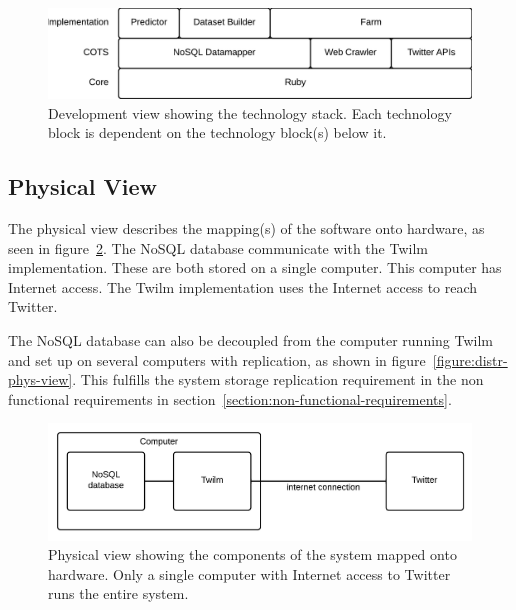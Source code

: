 \begin{figure}[H]
    \centerline{\includegraphics[width=4.5in]{image/architecture-development-view.png}}
    \caption[Development view]{Development view showing the technology stack. Each technology block is dependent on the technology block(s) below it.}
    \label{figure:development-view}
\end{figure}

\subsection{Physical View}
The physical view describes the mapping(s) of the software onto hardware, as seen in figure~\ref{figure:physical-view}. The NoSQL database communicate with the Twilm implementation. These are both stored on a single computer. This computer has Internet access. The Twilm implementation uses the Internet access to reach Twitter.

The NoSQL database can also be decoupled from the computer running Twilm and set up on several computers with replication, as shown in figure~\ref{figure:distr-phys-view}. This fulfills the system storage replication requirement in the non functional requirements in section~\ref{section:non-functional-requirements}.

\begin{figure}[H]
\centerline{\includegraphics[width=4.5in]{image/architecture-physical-view.png}}
\caption[Physical view]{Physical view showing the components of the system mapped onto hardware. Only a single computer with Internet access to Twitter runs the entire system.}
\label{figure:physical-view}
\end{figure}

